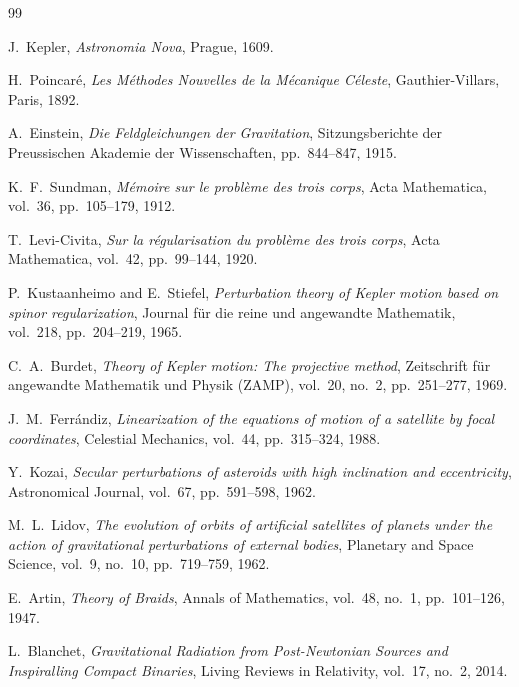\documentclass[11pt,a4paper,reqno]{article}
\theoremstyle{plain}
\theoremstyle{definition}
\theoremstyle{remark}
\numberwithin{equation}{section}
\numberwithin{table}{section}
\begin{document}
\begin{thebibliography}{99}

J.~Kepler, \emph{Astronomia Nova}, Prague, 1609.

H.~Poincar\'{e}, \emph{Les M\'{e}thodes Nouvelles de la M\'{e}canique C\'{e}leste}, Gauthier-Villars, Paris, 1892.

A.~Einstein, \emph{Die Feldgleichungen der Gravitation}, Sitzungsberichte der Preussischen Akademie der Wissenschaften, pp.~844--847, 1915.

K.~F.~Sundman, \emph{M\'{e}moire sur le probl\`{e}me des trois corps}, Acta Mathematica, vol.~36, pp.~105--179, 1912.

T.~Levi-Civita, \emph{Sur la r\'{e}gularisation du probl\`{e}me des trois corps}, Acta Mathematica, vol.~42, pp.~99--144, 1920.

P.~Kustaanheimo and E.~Stiefel, \emph{Perturbation theory of Kepler motion based on spinor regularization}, Journal f\"{u}r die reine und angewandte Mathematik, vol.~218, pp.~204--219, 1965.

C.~A.~Burdet, \emph{Theory of Kepler motion: The projective method}, Zeitschrift f\"{u}r angewandte Mathematik und Physik (ZAMP), vol.~20, no.~2, pp.~251--277, 1969.

J.~M.~Ferr\'{a}ndiz, \emph{Linearization of the equations of motion of a satellite by focal coordinates}, Celestial Mechanics, vol.~44, pp.~315--324, 1988.

Y.~Kozai, \emph{Secular perturbations of asteroids with high inclination and eccentricity}, Astronomical Journal, vol.~67, pp.~591--598, 1962.

M.~L.~Lidov, \emph{The evolution of orbits of artificial satellites of planets under the action of gravitational perturbations of external bodies}, Planetary and Space Science, vol.~9, no.~10, pp.~719--759, 1962.

E.~Artin, \emph{Theory of Braids}, Annals of Mathematics, vol.~48, no.~1, pp.~101--126, 1947.

L.~Blanchet, \emph{Gravitational Radiation from Post-Newtonian Sources and Inspiralling Compact Binaries}, Living Reviews in Relativity, vol.~17, no.~2, 2014.


\end{thebibliography}
\end{document}

